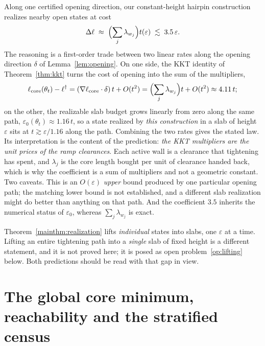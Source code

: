 \begin{remark}\label{rem:pred-thickness}
Along one certified opening direction, our constant-height hairpin construction realizes nearby open states at cost
\[
\Delta\ell\;\approx\;\Bigl(\sum_j\lambda_{w_j}\Bigr)t(\varepsilon)\;\lesssim\;3.5\,\varepsilon .
\]
The reasoning is a first-order trade between two linear rates along the opening direction $\delta$ of Lemma~\ref{lem:opening}. On one side, the KKT identity of Theorem~\ref{thm:kkt} turns the cost of opening into the sum of the multipliers,
\[
\ell_{\mathrm{core}}(\theta_t)-\ell^\dagger=(\nabla\ell_{\mathrm{core}}\cdot\delta)\,t+O(t^2)=\Bigl(\sum_j\lambda_{w_j}\Bigr)t+O(t^2)\approx4.11\,t;
\]
on the other, the realizable slab budget grows linearly from zero along the same path, $\varepsilon_0(\theta_t)\approx1.16\,t$, so a state realized by \emph{this construction} in a slab of height $\varepsilon$ sits at $t\gtrsim\varepsilon/1.16$ along the path. Combining the two rates gives the stated law. Its interpretation is the content of the prediction: \emph{the KKT multipliers are the unit prices of the ramp clearances}. Each active wall is a clearance that tightening has spent, and $\lambda_j$ is the core length bought per unit of clearance handed back, which is why the coefficient is a sum of multipliers and not a geometric constant. Two caveats. This is an $O(\varepsilon)$ \emph{upper} bound produced by one particular opening path; the matching lower bound is not established, and a different slab realization might do better than anything on that path. And the coefficient $3.5$ inherits the numerical status of $\varepsilon_0$, whereas $\sum_j\lambda_{w_j}$ is exact.
\end{remark}

\begin{remark}\label{rem:static-dynamic}
Theorem~\ref{mainthm:realization} lifts \emph{individual} states into slabs, one $\varepsilon$ at a time. Lifting an entire tightening path into a \emph{single} slab of fixed height is a different statement, and it is not proved here; it is posed as open problem~\ref{op:lifting} below. Both predictions should be read with that gap in view.
\end{remark}

\section{The global core minimum, reachability and the stratified census}\label{sec:census}

